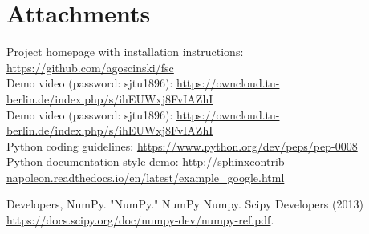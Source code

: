 \documentclass[a4paper, 11pt]{article}
\begin{document}
\section*{Attachments}
Project homepage with installation instructions: \url{https://github.com/agoscinski/fsc} \\
Demo video (password: sjtu1896): \url{https://owncloud.tu-berlin.de/index.php/s/ihEUWxj8FvIAZhI} \\
Demo video (password: sjtu1896): \url{https://owncloud.tu-berlin.de/index.php/s/ihEUWxj8FvIAZhI} \\
Python coding guidelines: \url{https://www.python.org/dev/peps/pep-0008} \\
Python documentation style demo: \url{http://sphinxcontrib-napoleon.readthedocs.io/en/latest/example_google.html}

\begin{thebibliography}{9}
 Developers, NumPy. "NumPy." NumPy Numpy. Scipy Developers (2013) \url{https://docs.scipy.org/doc/numpy-dev/numpy-ref.pdf}.
\end{thebibliography}
\end{document}
